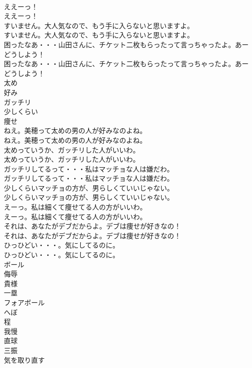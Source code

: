 \documentclass[8pt]{extreport}
\begin{document}
\begin{CJK}{UTF8}{min}
\\	ええーっ！	
\\	ええーっ！ 
\\	すいません。大人気なので、もう手に入らないと思いますよ。	
\\	すいません。大人気なので、もう手に入らないと思いますよ。 
\\	困ったなあ・・・山田さんに、チケット二枚もらったって言っちゃったよ。あーどうしよう！	
\\	困ったなあ・・・山田さんに、チケット二枚もらったって言っちゃったよ。あーどうしよう！ 
\\	太め
\\	好み
\\	ガッチリ
\\	少しくらい
\\	痩せ
\\	ねえ。美穂って太めの男の人が好みなのよね。	
\\	ねえ。美穂って太めの男の人が好みなのよね。 
\\	太めっていうか、ガッチリした人がいいわ。	
\\	太めっていうか、ガッチリした人がいいわ。 
\\	ガッチリしてるって・・・私はマッチョな人は嫌だわ。	
\\	ガッチリしてるって・・・私はマッチョな人は嫌だわ。 
\\	少しくらいマッチョの方が、男らしくていいじゃない。	
\\	少しくらいマッチョの方が、男らしくていいじゃない。 
\\	えーっ。私は細くて痩せてる人の方がいいわ。	
\\	えーっ。私は細くて痩せてる人の方がいいわ。 
\\	それは、あなたがデブだからよ。デブは痩せが好きなの！	
\\	それは、あなたがデブだからよ。デブは痩せが好きなの！ 
\\	ひっひどい・・・。気にしてるのに。	
\\	ひっひどい・・・。気にしてるのに。 
\\	ボール
\\	侮辱
\\	貴様
\\	一塁
\\	フォアボール
\\	へぼ
\\	程
\\	我慢
\\	直球
\\	三振
\\	気を取り直す

\end{CJK}
\end{document}
